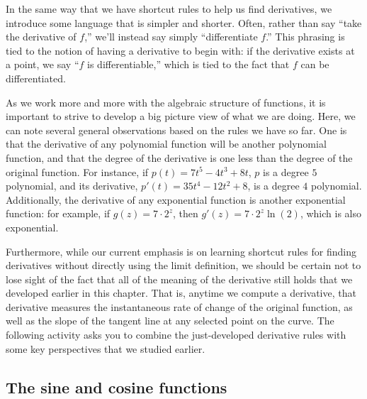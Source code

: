 \newpage


In the same way that we have shortcut rules to help us find derivatives, we introduce some language that is simpler and shorter.  Often, rather than say ``take the derivative of $f$,'' we'll instead say simply ``differentiate $f$.''  This phrasing is tied to the notion of having a derivative to begin with:  if the derivative exists at a point, we say ``$f$ is differentiable,'' which is tied to the fact that $f$ can be differentiated.

As we work more and more with the algebraic structure of functions, it is important to strive to develop a big picture view of what we are doing.  Here, we can note several general observations based on the rules we have so far.  One is that the derivative of any polynomial function will be another polynomial function, and that the degree of the derivative is one less than the degree of the original function.  For instance, if $p(t) = 7t^5 - 4t^3 + 8t$, $p$ is a degree $5$ polynomial, and its derivative, $p'(t) = 35t^4 - 12t^2 + 8$, is a degree $4$ polynomial.  Additionally, the derivative of any exponential function is another exponential function: for example, if $g(z) = 7 \cdot 2^z$, then $g'(z) = 7 \cdot 2^z \ln(2)$, which is also exponential.

Furthermore, while our current emphasis is on learning shortcut rules for finding derivatives without directly using the limit definition, we should be certain not to lose sight of the fact that all of the meaning of the derivative still holds that we developed earlier in this chapter.  That is, anytime we compute a derivative, that derivative measures the instantaneous rate of change of the original function, as well as the slope of the tangent line at any selected point on the curve.  The following activity asks you to combine the just-developed derivative rules with some key perspectives that we studied earlier.


\subsection*{The sine and cosine functions}

